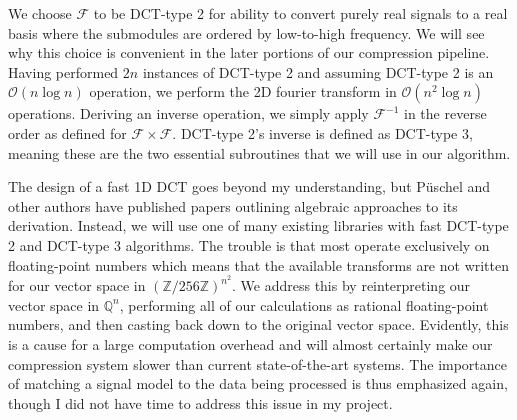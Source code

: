 \documentclass[12pt,technote]{IEEEtran}
\begin{document}
We choose $\mathcal{F}$ to be DCT-type 2 for ability to convert purely real signals to a real basis where the submodules are ordered by low-to-high frequency. We will see why this choice is convenient in the later portions of our compression pipeline. Having performed $2n$ instances of DCT-type 2 and assuming DCT-type 2 is an $\mathcal{O}(n\log{n})$ operation, we perform the 2D fourier transform in $\mathcal{O}(n^2\log{n})$ operations. Deriving an inverse operation, we simply apply $\mathcal{F}^{-1}$ in the reverse order as defined for $\mathcal{F}\times\mathcal{F}$. DCT-type 2's inverse is defined as DCT-type 3, meaning these are the two essential subroutines that we will use in our algorithm.

The design of a fast 1D DCT goes beyond my understanding, but P\"uschel and other authors have published papers outlining algebraic approaches to its derivation\cite{puschel2003cooley,fastdct1988}. Instead, we will use one of many existing libraries with fast DCT-type 2 and DCT-type 3 algorithms. The trouble is that most operate exclusively on floating-point numbers which means that the available transforms are not written for our vector space in $(\mathbb{Z}/256\mathbb{Z})^{n^2}$. We address this by reinterpreting our vector space in $\mathbb{Q}^n$, performing all of our calculations as rational floating-point numbers, and then casting back down to the original vector space. Evidently, this is a cause for a large computation overhead and will almost certainly make our compression system slower than current state-of-the-art systems. The importance of matching a signal model to the data being processed is thus emphasized again, though I did not have time to address this issue in my project.
\end{document}
